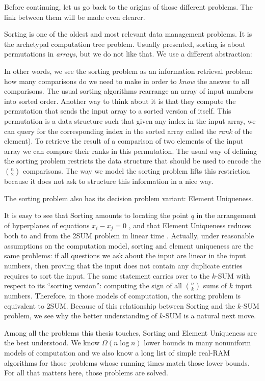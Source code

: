Before continuing, let us go back to the origins of those different problems.
The link between them will be made even clearer.

Sorting is one of the oldest and most relevant data management problems.
It is the archetypal computation tree problem.
%
Usually presented, sorting is about permutations in \emph{arrays}, but we do
not like that. We use a different abstraction:
%


In other words, we see the sorting problem as an information retrieval problem:
how many comparisons do we need to make in order to \emph{know} the answer to
all comparisons.
%
The usual sorting algorithms rearrange an array of input numbers into sorted
order. Another way to think about it is that they compute the permutation that
sends the input array to a sorted version of itself. This permutation is a data
structure such that given any index in the input array, we can query for the
corresponding index in the sorted array called the \emph{rank} of the element).
To retrieve the result of a comparison of two elements of the input array we can
compare their ranks in this permutation.
The usual way of defining the sorting problem restricts the data structure that
should be used to encode the \(n \choose 2\) comparisons.
The way we model the sorting problem lifts this restriction because it does not
ask to structure this information in a nice way.

The sorting problem also has its decision problem variant: Element Uniqueness.
%


It is easy to see
that Sorting amounts to locating the point \(q\) in
the arrangement of hyperplanes of equations \(x_i - x_j = 0\)%
, and
that Element Uniqueness reduces both to and from the 2SUM
problem in linear time%
.
%
Actually, under reasonable assumptions on the computation model, sorting and
element uniqueness are the same problems: if all questions we ask about the
input are linear in the input numbers, then proving that the input
does not contain any duplicate entries requires to sort the input.
%
The same statement carries over to the \(k\)-SUM with respect to its ``sorting
version'': computing the sign of all \(n \choose k\) sums of \(k\) input
numbers.
%
Therefore, in those models of computation, the sorting problem is equivalent to
2SUM.
%
Because of this relationship between Sorting and the \(k\)-SUM problem,
we see why the better understanding of \(k\)-SUM is a natural next move.

Among all the problems this thesis touches, Sorting and Element Uniqueness
are the best understood. We know \(\Omega(n \log n)\) lower bounds in many
nonuniform models of computation and we also know a long list of simple
real-RAM algorithms for those problems whose running times match those lower
bounds. For all that matters here, those problems are solved.
